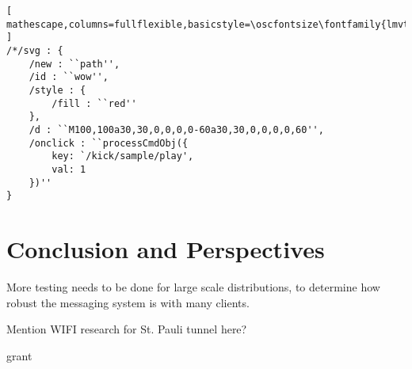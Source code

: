 \begin{lstlisting}[ mathescape,columns=fullflexible,basicstyle=\oscfontsize\fontfamily{lmvtt}\selectfont ]
/*/svg : {
    /new : ``path'',
    /id : ``wow'',
    /style : {
        /fill : ``red''
    },
    /d : ``M100,100a30,30,0,0,0,0-60a30,30,0,0,0,0,60'',
    /onclick : ``processCmdObj({
        key: `/kick/sample/play',
        val: 1
    })''
}
\end{lstlisting}





%
%
%
%
%
%
\section{Conclusion and Perspectives}

More testing needs to be done for large scale distributions, to determine how robust the messaging system is with many clients.

Mention WIFI research for St. Pauli tunnel here?





\begin{acknowledgments}

\innovativ grant


\end{acknowledgments} 

\balance






